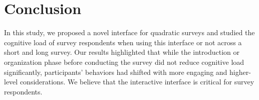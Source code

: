 \section{Conclusion}
In this study, we proposed a novel interface for quadratic surveys and studied the cognitive load of survey respondents when using this interface or not across a short and long survey. Our results highlighted that while the introduction or organization phase before conducting the survey did not reduce cognitive load significantly, participants' behaviors had shifted with more engaging and higher-level considerations. We believe that the interactive interface is critical for survey respondents.